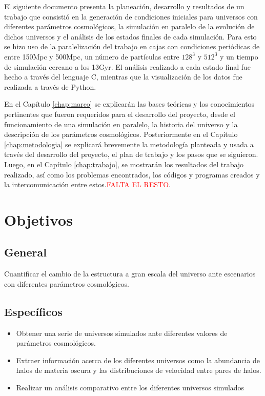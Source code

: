 El siguiente documento presenta la planeación, desarrollo y resultados de un trabajo que consistió en la generación de condiciones iniciales para universos con diferentes parámetros cosmológicos, la simulación en paralelo de la evolución de dichos universos y el análisis de los estados finales de cada simulación. Para esto se hizo uso de la paralelización del trabajo en cajas con condiciones periódicas de entre 150Mpc y 500Mpc, un número de partículas entre $128^3$ y $512^3$ y un tiempo de simulación cercano a los 13Gyr. El análisis realizado a cada estado final fue hecho a través del lenguaje C, mientras que la visualización de los datos fue realizada a través de Python. 

En el Capítulo \ref{chap:marco} se explicarán las bases teóricas y los conocimientos pertinentes que fueron requeridos para el desarrollo del proyecto, desde el funcionamiento de una simulación en paralelo, la historia del universo y la descripción de los parámetros cosmológicos. Posteriormente en el Capítulo \ref{chap:metodologia} se explicará brevemente la metodología planteada y usada a través del desarrollo del proyecto, el plan de trabajo y los pasos que se siguieron. Luego, en el Capítulo \ref{chap:trabajo}, se mostrarán los resultados del trabajo realizado, así como los problemas encontrados, los códigos y programas creados y la intercomunicación entre estos.\textcolor{red}{FALTA EL RESTO}.

\section{Objetivos}

\subsection*{General}
Cuantificar el cambio de la estructura a gran escala del universo ante escenarios con diferentes parámetros cosmológicos.
\subsection*{Específicos}
\begin{itemize}
	\item Obtener una serie de universos simulados ante diferentes valores de parámetros cosmológicos.
	\item Extraer información acerca de los diferentes universos como la abundancia de halos de materia oscura y las distribuciones de velocidad entre pares de halos.
	\item Realizar un análisis comparativo entre los diferentes universos simulados
\end{itemize}